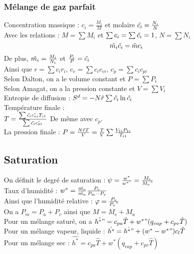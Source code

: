\documentclass[../main.tex]{subfiles}
\begin{document}
\subsubsection{Mélange de gaz parfait}
Concentration massique : $c_i = \frac{M_i}{M}$ et molaire $\Tilde{c_i} = \frac{N_i}{N}$\\
Avec les relations : $M = \sum M_i$ et $\sum c_i = \sum \Tilde{c_i} = 1$, $N = \sum N_i$\\
\begin{equation}
    \Tilde{m_i} \Tilde{c_i} = \Tilde{m} c_i
\end{equation}
De plus, $\Tilde{m_i} = \frac{M_i}{N_i}$ et $\frac{P_i}{P} = \Tilde{c_i}$\\

Ainsi que $r= \sum c_ir_i$, $c_v = \sum c_i c_{vi}$, $c_p = \sum c_i c_{pi}$\\

Selon Dalton, on a le volume constant et $P= \sum P_i$\\
Selon Amagat, on a la pression constante et $V = \sum V_i$\\
Entropie de diffusion : $S^d = -N \Tilde{r} \sum \Tilde{c_i} \ln{\Tilde{c_i}}$\\
Température finale :\\

$T = \frac{\sum \Tilde{c_i} \Tilde{c_{vi}} T_{i1}}{\sum \Tilde{c_i} \Tilde{c_{pi}}}$ De même avec $c_p$. \\
La pression finale : $P = \frac{N\Tilde{r}T}{V} = \frac{T}{V} \sum \frac{V_{1i} P_{1i}}{T_{i1}}$\\

\subsection{Saturation}
On définit le degré de saturation : $\psi = \frac{w^*}{w^{*"}} = \frac{M_e}{M_v"}$\\
Taux d'humidité : $w^* = \frac{\Tilde{m_v}}{\Tilde{m_a}} \frac{P_v}{P_m-P_v}$\\
Ainsi que l'humidité relative : $\varphi = \frac{P_v}{P_v"}$\\

On a $P_m = P_a+P_v$ ainsi que $M = M_e+M_a$\\

Pour un mélange saturé, on a $\hat{h^*"} = c_{pa} \hat{T} + w^*"(q_{vap} + c_{pv} \hat{T})$\\
Pour un mélange vapeur, liquide : $\hat{h^*} = \hat{h^*"} + (w^*-w^*")c_l \hat{T}$\\
Pour un mélange sec : $\hat{h^*} = c_{pa}\hat{T} + w^*(q_{vap} + c_{pv}\hat{T})$\\
\end{document}
